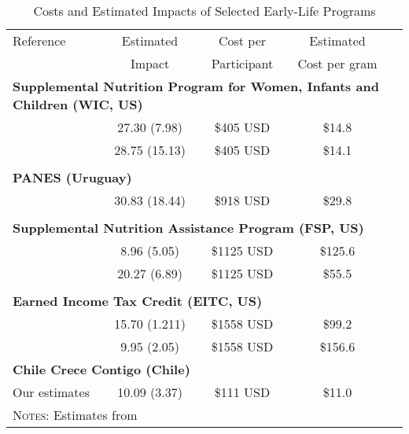 \documentclass[12pt]{article}
\begin{document}
\begin{spacing}{1.4}
\begin{table}
  \caption{Costs and Estimated Impacts of Selected Early-Life Programs}
  \label{tab:impactsOther}
  \begin{tabular}{lcccc} \toprule
    Reference & Estimated & Cost per    & Estimated      \\
    & Impact    & Participant & Cost per gram  \\ \midrule
    \multicolumn{5}{l}{\textbf{Supplemental Nutrition Program for Women, Infants and Children (WIC, US)}} \\
    \citet{RossinSlater2013} & 27.30 (7.98)               & \$405 USD & \$14.8 \\
    \citet{Hoynesetal2011}   & 28.75 (15.13)              & \$405 USD & \$14.1 \\
    &&&\\
    \multicolumn{5}{l}{\textbf{PANES (Uruguay)}} \\
    \citet{Amaranteetal2016} & 30.83 (18.44)  & \$918 USD & \$29.8 \\
    &&&\\
    \multicolumn{5}{l}{\textbf{Supplemental Nutrition Assistance Program (FSP, US)}} \\
    \citet{Almondetal2011}   & 8.96 (5.05) & \$1125 USD & \$125.6 \\
                             & 20.27 (6.89) & \$1125 USD & \$55.5 \\
    &&&\\
    \multicolumn{5}{l}{\textbf{Earned Income Tax Credit (EITC, US)}} \\
    \citet{Strullyetal2010}& 15.70 (1.211)& \$1558 USD &  \$99.2\\
    \citet{Hoynesetal2015} & 9.95  (2.05)  & \$1558 USD & \$156.6  \\
    \multicolumn{5}{l}{\textbf{Chile Crece Contigo (Chile)}} \\
    Our estimates            & 10.09 (3.37)   & \$111 USD & \$11.0\\ \bottomrule
    \multicolumn{5}{p{15.0cm}}{{\footnotesize\textsc{Notes}: Estimates from
}}
\end{tabular}
\end{table}
\end{spacing}
\end{document}
